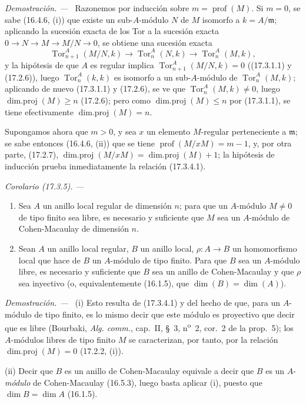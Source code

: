 \documentclass[10pt,oneside]{book}
\makeatletter
\newcommand{\setmanualcurrentlabel}[1]{\def\@currentlabel{#1}}
\newcommand{\oldpage}[2][]{%
  \setcounter{footnote}{0}%
  \marginpar{\scriptsize\textbf{#1}~|~#2}\ignorespaces}
\newenvironment{corollary}[1][]{%
  \setmanualcurrentlabel{#1}\par\medskip\noindent\itshape Corolario (#1). ---\ }{\par}
\newenvironment{proof}{%
  \par\medskip\noindent\textit{Demostración. ---\ }}{\par}
\providecommand{\setmin}{-}%
\makeatother
\begin{document}
\begin{proof}
Razonemos por inducción sobre $m=\operatorname{prof}(M)$. Si $m=0$, se sabe
(16.4.6, (i)) que existe un sub-$A$-módulo $N$ de $M$ isomorfo a
$k=A/\mathfrak{m}$; aplicando la sucesión exacta de los Tor a la sucesión
exacta $0\longrightarrow N\longrightarrow M\longrightarrow M/N\longrightarrow0$,
se obtiene una sucesión exacta
\[
  \operatorname{Tor}^A_{n+1}(M/N,k)\longrightarrow
  \operatorname{Tor}^A_n(N,k)\longrightarrow
  \operatorname{Tor}^A_n(M,k),
\]
y la hipótesis de que $A$ es regular implica
$\operatorname{Tor}^A_{n+1}(M/N,k)=0$ ((17.3.1.1) y (17.2.6)), luego
$\operatorname{Tor}^A_n(k,k)$ es isomorfo a un sub-$A$-módulo de
$\operatorname{Tor}^A_n(M,k)$; aplicando de nuevo (17.3.1.1) y (17.2.6), se
ve que $\operatorname{Tor}^A_n(M,k)\neq0$, luego
$\operatorname{dim.proj}(M)\geq n$ (17.2.6); pero como
$\operatorname{dim.proj}(M)\leq n$ por (17.3.1.1), se tiene efectivamente
$\operatorname{dim.proj}(M)=n$.

Supongamos ahora que $m>0$, y sea $x$ un elemento $M$-regular perteneciente a
$\mathfrak{m}$; se sabe entonces (16.4.6, (ii)) que se tiene
$\operatorname{prof}(M/xM)=m\setmin 1$, y, por otra parte, (17.2.7),
$\operatorname{dim.proj}(M/xM)=\operatorname{dim.proj}(M)+1$; la hipótesis de
inducción prueba inmediatamente la relación (17.3.4.1).
\end{proof}

\oldpage[0\textsubscript{IV-1}]{50}

\begin{corollary}[17.3.5]
\label{0.17.3.5-es}
\begin{enumerate}
  \item[\rm(i)] Sea $A$ un anillo local regular de dimensión $n$; para que un
  $A$-módulo $M\neq0$ de tipo finito sea libre, es necesario y suficiente que
  $M$ sea un $A$-módulo de Cohen-Macaulay de dimensión $n$.
  \item[\rm(ii)] Sean $A$ un anillo local regular, $B$ un anillo local,
  $\rho:A\to B$ un homomorfismo local que hace de $B$ un $A$-módulo de tipo
  finito. Para que $B$ sea un $A$-módulo libre, es necesario y suficiente que
  $B$ sea un anillo de Cohen-Macaulay y que $\rho$ sea inyectivo \textup{(o,
  equivalentemente (16.1.5), que $\dim(B)=\dim(A)$)}.
\end{enumerate}
\end{corollary}

\begin{proof}
(i) Esto resulta de (17.3.4.1) y del hecho de que, para un $A$-módulo de tipo
finito, es lo mismo decir que este módulo es proyectivo que decir que es libre
(Bourbaki, \emph{Alg. comm.}, cap.~II, \S~3, n\textsuperscript{o}~2, cor.~2 de
la prop.~5); los $A$-módulos libres de tipo finito $M$ se caracterizan, por
tanto, por la relación $\operatorname{dim.proj}(M)=0$ (17.2.2, (i)).

(ii) Decir que $B$ es un anillo de Cohen-Macaulay equivale a decir que $B$ es
un $A$-\emph{módulo} de Cohen-Macaulay (16.5.3), luego basta aplicar (i), puesto que
$\dim B=\dim A$ (16.1.5).
\end{proof}
\end{document}
